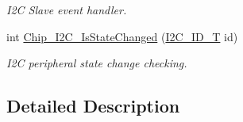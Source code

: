 \begin{DoxyCompactItemize}
\begin{DoxyCompactList}\small\item\em I2\-C Slave event handler. \end{DoxyCompactList}\item 
int \hyperlink{group__I2C__17XX__40XX_ga4240d03d5dda43ddc8afd527b3172318}{Chip\-\_\-\-I2\-C\-\_\-\-Is\-State\-Changed} (\hyperlink{group__I2C__17XX__40XX_ga957556a4d900506cd4cba8427afd81e6}{I2\-C\-\_\-\-I\-D\-\_\-\-T} id)
\begin{DoxyCompactList}\small\item\em I2\-C peripheral state change checking. \end{DoxyCompactList}\end{DoxyCompactItemize}


\subsection{Detailed Description}


